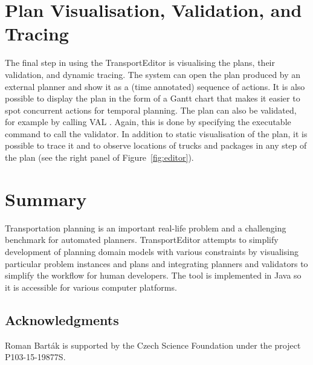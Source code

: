 \documentclass[letterpaper]{article}
\begin{document}
\section{Plan Visualisation, Validation, and Tracing}
The final step in using the TransportEditor is visualising the plans, their validation, and dynamic tracing. The system can open the plan produced by an external planner and show it as a (time annotated) sequence of actions. It is also possible to display the plan in the form of a Gantt chart that makes it easier to spot concurrent actions for temporal planning. The plan can also be validated, for example by calling VAL \cite{val}. Again, this is done by specifying the executable command to call the validator. In addition to static visualisation of the plan, it is possible to trace it and to observe locations of trucks and packages in any step of the plan (see the right panel of Figure~\ref{fig:editor}).


\section{Summary}
Transportation planning is an important real-life problem and a challenging benchmark for automated planners. TransportEditor attempts to simplify development of planning domain models with various constraints by visualising particular problem instances and plans and integrating planners and validators to simplify the workflow for human developers. The tool is implemented in Java so it is accessible for various computer platforms.


\subsection*{Acknowledgments}
Roman Bart\'{a}k is supported by the Czech Science Foundation under the project P103-15-19877S.
\end{document}

